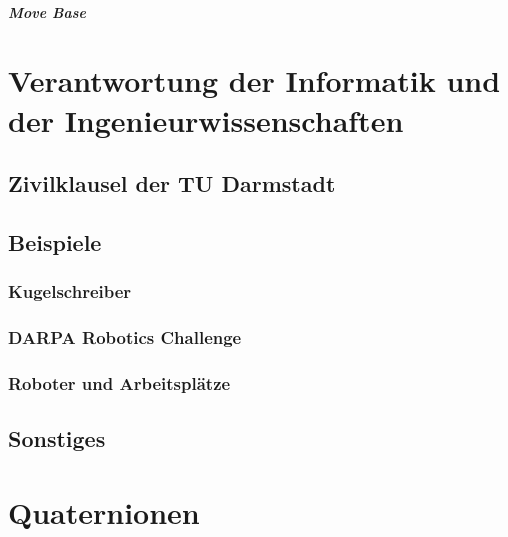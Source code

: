 \documentclass[a4paper, 11pt, accentcolor = tud3b]{tudreport}
\begin{document}
					\paragraph{Move Base} %

	\chapter{Verantwortung der Informatik und der Ingenieurwissenschaften} %

		\section{Zivilklausel der TU Darmstadt} %

		\section{Beispiele} %

			\subsection{Kugelschreiber} %

			\subsection{DARPA Robotics Challenge} %

			\subsection{Roboter und Arbeitsplätze} %

		\section{Sonstiges} %





	\appendix

	\chapter{Quaternionen} %
\end{document}
